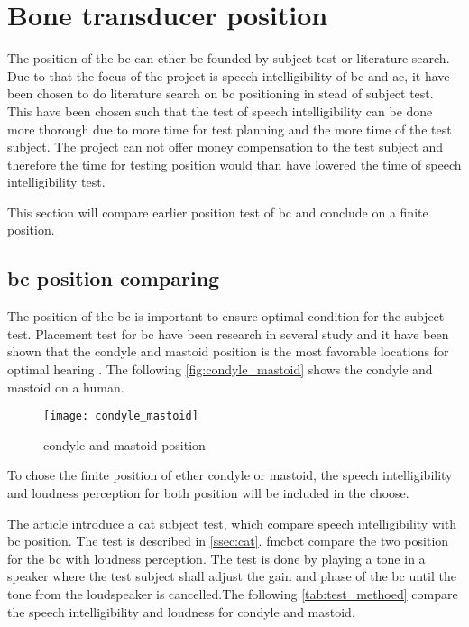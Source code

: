 \section{Bone transducer position}

The position of the \gls{bc} can ether be founded by subject test or literature search. Due to that the focus of the project is speech intelligibility of \gls{bc} and \gls{ac}, it have been chosen to do literature search on \gls{bc} positioning in stead of subject test. This have been chosen such that the test of speech intelligibility can be done more thorough due to more time for test planning and the more time of the test subject. The project can not offer money compensation to the test subject and therefore the time for testing position would than have lowered the time of speech intelligibility test. 

This section will compare earlier position test of \gls{bc} and conclude on a finite position.

\subsection{\gls{bc} position comparing}
The position of the \gls{bc} is important to ensure optimal condition for the subject test. Placement test for \gls{bc} have been research in several study and it have been shown that the condyle and mastoid position is the most favorable locations for optimal hearing \citep{cat_test}. The following \autoref{fig:condyle_mastoid} shows the  condyle and mastoid on a human.

\begin{figure}[H]
	\centering
		\texttt{[image: condyle\_mastoid]}
		\caption{condyle and mastoid position \citep{cat_test}}
		\label{fig:condyle_mastoid}
\end{figure}

To chose the finite position of ether condyle or mastoid, the speech intelligibility and loudness perception for both position will be included in the choose. 


The article \citep{cat_test} introduce a \gls{cat} subject test, which compare  speech intelligibility with \gls{bc} position. The test is described in \autoref{ssec:cat}. \gls{fmcbct} \citep{freefield_method} compare the two position for the \gls{bc} with loudness perception. The test is done by playing a tone in a speaker where the test subject shall adjust the gain and phase of the \gls{bc} until the tone from the loudspeaker is cancelled.The following \autoref{tab:test_methoed} compare the speech intelligibility and loudness for condyle and mastoid.



